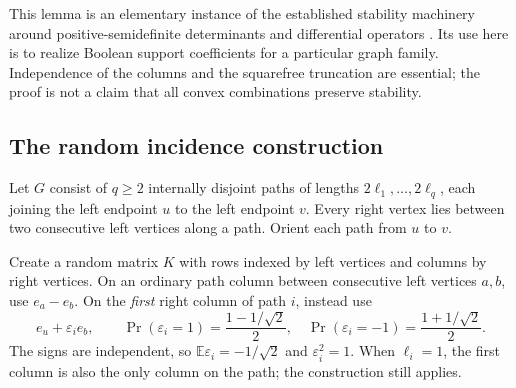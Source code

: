 \documentclass[11pt]{article}
\numberwithin{equation}{section}
\theoremstyle{definition}
\newcommand{\EE}{\mathbb E}
\newcommand{\ep}{\varepsilon}
\begin{document}
This lemma is an elementary instance of the established stability
machinery around positive-semidefinite determinants and differential
operators \cite{COSW,Branden}.  Its use here is to realize Boolean support
coefficients for a particular graph family.  Independence of the columns
and the squarefree truncation are essential; the proof is not a claim
that all convex combinations preserve stability.

\subsection{The random incidence construction}

Let $G$ consist of $q\ge2$ internally disjoint paths of lengths
$2\ell_1,\ldots,2\ell_q$, each joining the left endpoint $u$ to the left
endpoint $v$.  Every right vertex lies between two consecutive left
vertices along a path.  Orient each path from $u$ to $v$.

Create a random matrix $K$ with rows indexed by left vertices and columns
by right vertices.  On an ordinary path column between consecutive left
vertices $a,b$, use $e_a-e_b$.  On the \emph{first} right column of path
$i$, instead use
\begin{equation}
 e_u+\ep_i e_b,
 \qquad
 \Pr(\ep_i=1)=\frac{1-1/\sqrt2}{2},\quad
 \Pr(\ep_i=-1)=\frac{1+1/\sqrt2}{2}.
 \label{ade:eq:signlaw}
\end{equation}
The signs are independent, so $\EE\ep_i=-1/\sqrt2$ and
$\ep_i^2=1$.  When $\ell_i=1$, the first column is also the only column
on the path; the construction still applies.
\end{document}
